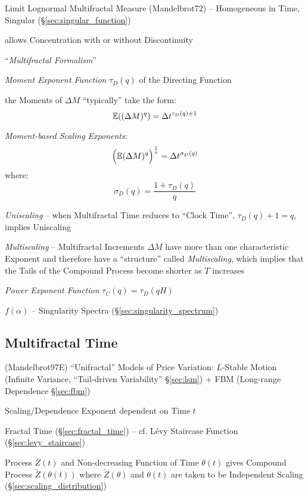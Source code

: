 Limit Lognormal Multifractal Measure (Mandelbrot72) -- Homogeneous in Time,
Singular (\S\ref{sec:singular_function})

allows Concentration with or without Discontinuity

``\emph{Multifractal Formalism}''

\emph{Moment Exponent Function} $\tau_D(q)$ of the Directing Function

the Moments of $\Delta M$ ``typically'' take the form:
\[
  \mathbb{E}((\Delta M)^q) = \Delta t^{\tau_D(q) + 1}
\]

\emph{Moment-based Scaling Exponents}:
\[
  \Big(\mathbb{E}(\Delta M)^q\Big)^\frac{1}{q} = \Delta t^{\sigma_D(q)}
\]
where:
\[
  \sigma_D(q) = \frac{1 + \tau_D(q)}{q}
\]

\emph{Uniscaling} -- when Multifractal Time reduces to ``Clock Time'',
$\tau_D(q) + 1 = q$, implies Uniscaling

\emph{Multiscaling} -- Multifractal Increments $\Delta M$ have more than one
characteristic Exponent and therefore have a ``structure'' called
\emph{Multiscaling}, which implies that the Tails of the Compound Process become
shorter as $T$ increases

\emph{Power Exponent Function} $\tau_C(q) = \tau_D(qH)$

$f(\alpha)$ -- Singularity Spectra (\S\ref{sec:singularity_spectrum})



\subsection{Multifractal Time}\label{sec:multifractal_time}

(Mandelbrot97E) ``Unifractal'' Models of Price Variation: $L$-Stable Motion
(Infinite Variance, ``Tail-driven Variability'' \S\ref{sec:lsm}) + FBM
(Long-range Dependence \S\ref{sec:fbm})

Scaling/Dependence Exponent dependent on Time $t$

Fractal Time (\S\ref{sec:fractal_time}) -- cf. L\'evy Staircase Function
(\S\ref{sec:levy_staircase})

Process $Z(t)$ and Non-decreasing Function of Time $\theta(t)$ gives Compound
Process $\tilde{Z}(\theta(t))$ where $\tilde{Z}(\theta)$ and $\theta(t)$ are
taken to be Independent Scaling (\S\ref{sec:scaling_distribution})

